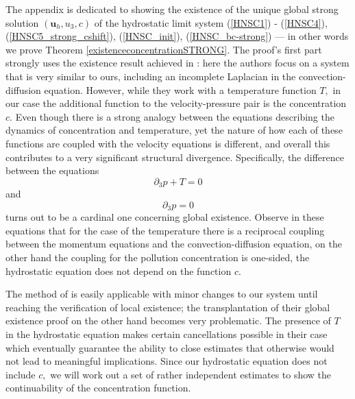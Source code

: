 \documentclass[11pt]{article}
\begin{document}
The appendix is dedicated to showing the existence of the unique global strong solution $(\mathbf{u}_h, u_3, c)$ of the hydrostatic limit system (\ref{HNSC1}) - (\ref{HNSC4}), (\ref{HNSC5_strong_cshift}), (\ref{HNSC_init}), (\ref{HNSC_bc-strong}) --- in other words we prove Theorem \ref{existenceconcentrationSTRONG}. The proof's first part strongly uses the existence result achieved in \cite{cao2014local}: here the authors focus on a system that is very similar to ours, including an incomplete Laplacian in the convection-diffusion equation. However, while they work with a temperature function $T,$ in our case the additional function to the velocity-pressure pair is the concentration $c.$ Even though there is a strong analogy between the equations describing the dynamics of concentration and temperature, yet the nature of how each of these functions are coupled with the velocity equations is different, and overall this contributes to a very significant structural divergence. Specifically, the difference between the equations $$ \partial_3 p + T = 0$$ and $$ \partial_3 p = 0$$ turns out to be a cardinal one concerning global existence. Observe in these equations that for the case of the temperature there is a reciprocal coupling between the momentum equations and the convection-diffusion equation, on the other hand the coupling for the pollution concentration is one-sided, the hydrostatic equation does not depend on the function $c.$

The method of \cite{cao2014local} is easily applicable with minor changes to our system until reaching the verification of local existence; the transplantation of their global existence proof on the other hand becomes very problematic. The presence of $T$ in the hydrostatic equation makes certain cancellations possible in their case which eventually guarantee the ability to close estimates that otherwise would not lead to meaningful implications. Since our hydrostatic equation does not include $c,$ we will work out a set of rather independent estimates to show the continuability of the concentration function.
\end{document}
